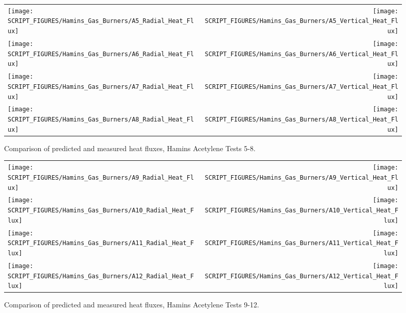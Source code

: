 \begin{figure}[p]
\begin{tabular*}{\textwidth}{l@{\extracolsep{\fill}}r}
\texttt{[image: SCRIPT\_FIGURES/Hamins\_Gas\_Burners/A5\_Radial\_Heat\_Flux]} &
\texttt{[image: SCRIPT\_FIGURES/Hamins\_Gas\_Burners/A5\_Vertical\_Heat\_Flux]} \\
\texttt{[image: SCRIPT\_FIGURES/Hamins\_Gas\_Burners/A6\_Radial\_Heat\_Flux]} &
\texttt{[image: SCRIPT\_FIGURES/Hamins\_Gas\_Burners/A6\_Vertical\_Heat\_Flux]} \\
\texttt{[image: SCRIPT\_FIGURES/Hamins\_Gas\_Burners/A7\_Radial\_Heat\_Flux]} &
\texttt{[image: SCRIPT\_FIGURES/Hamins\_Gas\_Burners/A7\_Vertical\_Heat\_Flux]} \\
\texttt{[image: SCRIPT\_FIGURES/Hamins\_Gas\_Burners/A8\_Radial\_Heat\_Flux]} &
\texttt{[image: SCRIPT\_FIGURES/Hamins\_Gas\_Burners/A8\_Vertical\_Heat\_Flux]}
\end{tabular*}
\label{Hamins_Acetylene_5-8}
\caption[Heat flux predictions, Hamins acetylene burner Tests 5-8]
{Comparison of predicted and measured heat fluxes, Hamins Acetylene Tests 5-8.}
\end{figure}

\begin{figure}[p]
\begin{tabular*}{\textwidth}{l@{\extracolsep{\fill}}r}
\texttt{[image: SCRIPT\_FIGURES/Hamins\_Gas\_Burners/A9\_Radial\_Heat\_Flux]} &
\texttt{[image: SCRIPT\_FIGURES/Hamins\_Gas\_Burners/A9\_Vertical\_Heat\_Flux]} \\
\texttt{[image: SCRIPT\_FIGURES/Hamins\_Gas\_Burners/A10\_Radial\_Heat\_Flux]} &
\texttt{[image: SCRIPT\_FIGURES/Hamins\_Gas\_Burners/A10\_Vertical\_Heat\_Flux]} \\
\texttt{[image: SCRIPT\_FIGURES/Hamins\_Gas\_Burners/A11\_Radial\_Heat\_Flux]} &
\texttt{[image: SCRIPT\_FIGURES/Hamins\_Gas\_Burners/A11\_Vertical\_Heat\_Flux]} \\
\texttt{[image: SCRIPT\_FIGURES/Hamins\_Gas\_Burners/A12\_Radial\_Heat\_Flux]} &
\texttt{[image: SCRIPT\_FIGURES/Hamins\_Gas\_Burners/A12\_Vertical\_Heat\_Flux]}
\end{tabular*}
\label{Hamins_Acetylene_9-12}
\caption[Heat flux predictions, Hamins acetylene burner Tests 9-12]
{Comparison of predicted and measured heat fluxes, Hamins Acetylene Tests 9-12.}
\end{figure}

